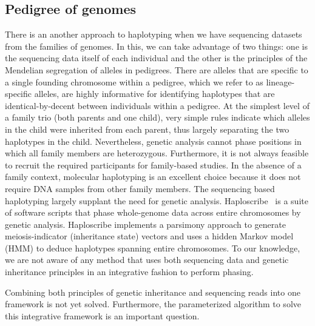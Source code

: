 \subsection{Pedigree of genomes}
There is an another approach to haplotyping when we have sequencing datasets from the families of genomes.
In this, we can take advantage of two things: one is the sequencing data itself of each individual and the other is the principles of the Mendelian segregation of alleles in pedigrees. 
There are alleles that are specific to a single founding chromosome within a pedigree, which we refer to as lineage-specific alleles, are highly informative for identifying haplotypes that are identical-by-decent between individuals within a pedigree.
At the simplest level of a family trio (both parents and one child), very simple rules indicate which alleles in the child were inherited from each parent, thus largely separating the two haplotypes in the child.  
Nevertheless, genetic analysis cannot phase positions in which all family members are heterozygous. 
Furthermore, it is not always feasible to recruit the required participants for family-based studies. In the absence of a family context, molecular haplotyping is an excellent choice because it does not require DNA samples from other family members. 
The sequencing based haplotyping largely supplant the need for genetic analysis.
Haploscribe~\citep{roach2011chromosomal} is a suite of software scripts that phase whole-genome data across entire chromosomes by genetic analysis. Haploscribe implements a parsimony approach to generate
meiosis-indicator (inheritance state) vectors and uses a hidden Markov model (HMM) to deduce haplotypes spanning entire chromosomes.
To our knowledge, we are not aware of any method that uses both sequencing data and genetic inheritance principles in an integrative fashion to perform phasing.

\begin{gaps}
 Combining both principles of genetic inheritance and sequencing reads into one framework is not yet solved. Furthermore, the parameterized algorithm to solve this integrative framework is an important question.
\end{gaps}

